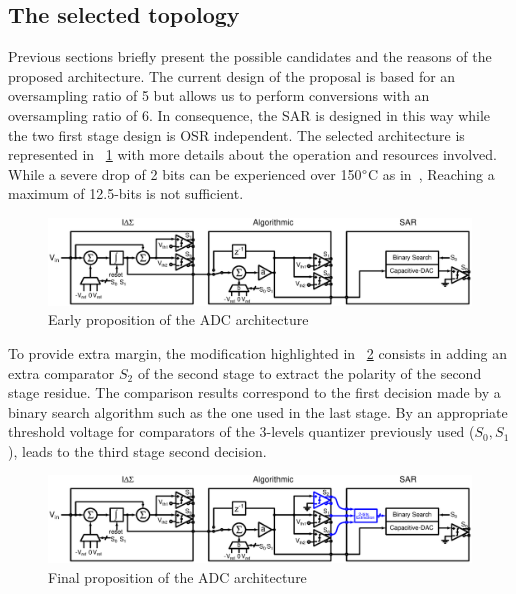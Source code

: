 \subsection{The selected topology}
\label{sec:selected-topology}
Previous sections briefly present the possible candidates and the reasons of the proposed architecture. The current design of the proposal is based for an oversampling ratio of 5 but allows us to perform conversions with an oversampling ratio of 6. In consequence, the SAR is designed in this way while the two first stage design is OSR independent. The selected architecture is represented in \figurename~\ref{fig:early-prop-adc-architecture} with more details about the operation and resources involved. While a severe drop of 2 bits can be experienced over 150\(\degree \)C as in~\cite{Ericson2004}, Reaching a maximum of 12.5-bits is not sufficient.

\begin{figure}[htp]
	\centering
	\includegraphics[width=\textwidth]{Chapter4/Figs/architecture-full-principle.ps}
	\caption{Early proposition of the ADC architecture}
	\label{fig:early-prop-adc-architecture}
\end{figure}

To provide extra margin, the modification highlighted in \figurename~\ref{fig:final-prop-adc-architecture} consists in adding an extra comparator \(S_2\) of the second stage to extract the polarity of the second stage residue. The comparison results correspond to the first decision made by a binary search algorithm such as the one used in the last stage. By an appropriate threshold voltage for comparators of the 3-levels quantizer previously used (\(S_0, S_1 \)), leads to the third stage second decision.

\begin{figure}[htp]
	\centering
	\includegraphics[width=\textwidth]{Chapter4/Figs/architecture-full-principle-final.ps}
	\caption{Final proposition of the ADC architecture}
	\label{fig:final-prop-adc-architecture}
\end{figure}

